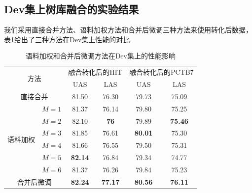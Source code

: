 \subsection{Dev集上树库融合的实验结果}
我们采用直接合并方法、语料加权方法和合并后微调三种方法来使用转化后数据，表\ref{tb:Dev-comb-results}给出了三种方法在Dev集上性能的对比.
\begin{table}[hb!]
    \addtolength{\tabcolsep}{+1.0mm}
    \centering
    \caption{语料加权和合并后微调方法在Dev集上的性能影响}
    \label{tb:Dev-comb-results}
    \begin{tabular}{cc cc cc}
        \toprule
        \multicolumn{2}{c}{\multirow{2}{3.3cm}{方法}}
                                     & \multicolumn{2}{c}{融合转化后的HIT} & \multicolumn{2}{c}{融合转化后的PCTB7}                                  \\
        \cmidrule(lr){3-4}
        \cmidrule(lr){5-6}
                                     &                                     & UAS                                   & LAS      & UAS      & LAS      \\
        \midrule
        \multicolumn{2}{c}{直接合并} & 81.50                               & 76.30                                 & 79.73    & 75.09               \\
        \midrule
        \multirow{6}{2cm}{语料加权}
                                     & $M=1$                               & 81.37                                 & 76.14    & 79.80    & 75.25    \\
                                     & $M=2$                               & 82.10                                 & \bf76    & 79.89    & \bf75.46 \\
                                     & $M=3$                               & 81.85                                 & 76.61    & \bf80.01 & 75.30    \\
                                     & $M=4$                               & 81.66                                 & 76.55    & 79.50    & 75.31    \\
                                     & $M=5$                               & \bf82.14                              & 76.84    & 79.34    & 74.77    \\
                                     & $M=6$                               & 81.37                                 & 76.26    & 79.84    & 75.23    \\
        \midrule
        \multicolumn{2}{c}{合并后微调}
                                     & \bf82.24                            & \bf77.17                              & \bf80.56 & \bf76.11            \\
        \bottomrule
    \end{tabular}
\end{table}

